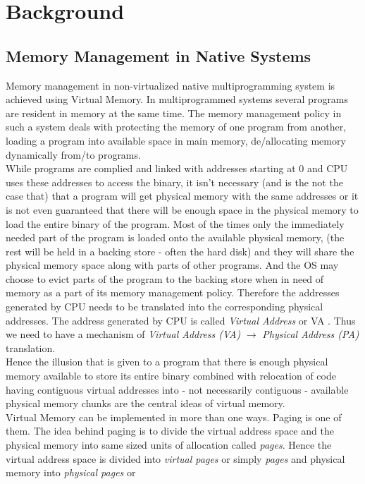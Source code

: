 \chapter{Background}

\section{Memory Management in Native Systems}
Memory management in non-virtualized native multiprogramming system is achieved using Virtual
Memory. In multiprogrammed systems several programs are resident in memory at the same time.
The memory management policy in such a system deals with protecting the memory of one program from 
another, loading a program into available space in main memory, de/allocating memory dynamically
from/to programs.\\
While programs are complied and linked with addresses starting at $0$ and CPU uses 
these addresses to access the binary, it isn't necessary (and is the not the case that) that a
program will get physical memory with the same addresses or it is not even guaranteed that there
will be enough space in the physical memory to load the entire binary of the program. Most of the
times only the immediately needed part of the program is loaded onto the available physical
memory, (the rest will be held in a backing store - often the hard disk) and they will share the
physical memory space along with parts of other programs. And the OS may choose to evict parts of
the program to the backing store when in need of memory as a part of its memory management policy.
Therefore the addresses generated by CPU needs to be translated into the corresponding physical
addresses. The address generated by CPU is called \textit{Virtual Address} or VA . Thus we need to
have a mechanism of \textit{Virtual Address (VA)} $\rightarrow$ \textit{Physical Address (PA)}
translation.\\
Hence the illusion that is given to a program that there is enough physical memory available to
store its entire binary combined with relocation of code having contiguous virtual addresses into
- not necessarily contiguous - available physical memory chunks are the central ideas of virtual
memory.\\
Virtual Memory can be implemented in more than one ways. Paging is one of them. The idea behind
paging is to divide the virtual address space and the physical memory into same sized units of
allocation called \textit{pages}. Hence the virtual address space is divided into \textit{virtual
pages} or simply \textit{pages} and physical memory into \textit{physical pages} or
